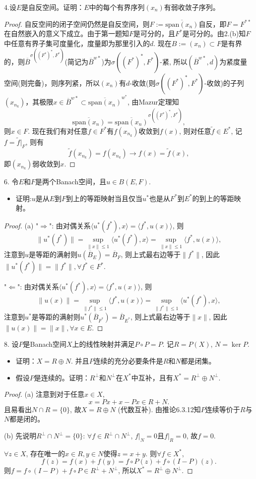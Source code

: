 \documentclass[a4paper,8pt]{ctexart}\textwidth 140mm \textheight 216mm
\newcommand{\8}{\infty}
\newcommand{\la}{\langle}
\newcommand{\ra}{\rangle}
\newcommand{\RA}{\Rightarrow}
\newcommand{\LA}{\Leftarrow}
\begin{document}
4.设$E$是自反空间。证明：$E$中的每个有界序列$(x_n)$有弱收敛子序列。
\begin{proof}
	自反空间的闭子空间仍然是自反空间，则$F:=\overline{\mathrm{span}(x_n)}$自反，即$F=F^{**}$在自然嵌入的意义下成立。由于第一题知$F$是可分的，且$F^*$是可分的。由2.(b)知$F$中任意有界子集可度量化，度量即为那里引入的$d$. 现在$B:=(x_n)\subset F$是有界的，则$\overline{B}^{\sigma((F^*)^*,F^*)}$(简记为$\overline{B}^{w*}$)为$\sigma((F^*)^*,F^*)$-紧, 所以$(\overline{B}^{w*},d)$为紧度量空间(则完备)，则序列紧，所以$(x_n)$有$d$-收敛(则$\sigma((F^*)^*,F^*)$-收敛)的子列$(x_{n_k})$，其极限$x\in \overline{B}^{w*}\subset \overline{\mathrm{span}(x_n)}^{w^*}$, 
	由Mazur定理知
	\[\overline{\mathrm{span}(x_n)}=\overline{\mathrm{span}(x_n)}^{\sigma((F^*)^*,F^*)},\] 
	则$x\in F$. 现在我们有对任意$f\in F^*$有$f(x_{n_k})$收敛到$f(x)$, 则对任意$\tilde{f}\in E^*$, 记$f=\tilde{f}|_{F}$, 则有
	\[\tilde{f}(x_{n_k})=f(x_{n_k})\to f(x)=\tilde{f}(x),\]
	即$(x_{n_k})$弱收敛到$x$.
\end{proof}

6. 令$E$和$F$是两个Banach空间，且$u\in B(E,F)$.
\begin{itemize}
	\item[(a)] 证明:$u$是从$E$到$F$到上的等距映射当且仅当$u^*$也是从$F^*$到$E^*$的到上的等距映射。
\end{itemize}
\begin{proof}
	(a) "$\RA$": 由对偶关系$\la u^*(f^*), x\ra=\la f^*, u(x)\ra$, 则
	\[\|u^*(f^*)\|=\sup_{\|x\|\leq 1}\la u^*(f^*), x\ra=\sup_{\|x\|\leq 1}\la f^*, u(x)\ra,\]
	注意到$u$是等距的满射则$u(\overline{B}_{E})=\overline{B}_F$, 则上式最右边等于$\|f^*\|$, 因此$\|u^*(f^*)\|=\|f^*\|,\forall f^*\in F^*$.
	
	"$\LA$": 由对偶关系$\la u^*(f^*), x\ra=\la f^*, u(x)\ra$, 则
	\[\|u(x)\|=\sup_{\|f^*\|\leq 1}\la f^*, u(x)\ra=\sup_{\|f^*\|\leq 1}\la u^*(f^*), x\ra,\]
	注意到$u^*$是等距的满射则$u^*(\overline{B}_{F^*})=\overline{B}_{E^*}$, 则上式最右边等于$\|x\|$, 因此$\|u(x)\|=\|x\|,\forall x\in E$.
\end{proof}

8. 设$P$是Banach空间$X$上的线性映射并满足$P\circ P=P$. 记$R=P(X)$, $N=\ker P$.
\begin{itemize}
	\item[(a)] 证明：$X=R\oplus N$. 并且$P$连续的充分必要条件是$R$和$N$都是闭集。 
	\item[(b)] 假设$P$是连续的。证明：$R^{\perp}$和$N^{\perp}$在$X^*$中互补，且有$X^*=R^{\perp}\oplus N^{\perp}$. 
\end{itemize}
\begin{proof}
	(a) 注意到对于任意$x\in X$, 
	\[x=Px+x-Px\in R+N.\]
	且易看出$N\cap R=\{0\}$, 故$X=R\oplus N$ (代数互补). 由推论6.3.12知$P$连续等价于$R$与$N$都是闭的。
	
	(b) 先说明$R^{\perp}\cap N^{\perp}=\{0\}$: $\forall f\in R^{\perp}\cap N^{\perp}$, $f|_N=0$且$f|_R=0$, 故$f=0$. 
	
	$\forall z\in X$, 存在唯一的$x\in R,y\in N$使得$z=x+y$. 则$\forall f\in X^*$, 
	\[f(z)=f(x)+f(y)=f\circ P(z)+f\circ (I-P)(z).\]
	则$f=f\circ (I-P)+f\circ P\in R^{\perp}+N^{\perp}$, 所以$X^*=R^{\perp}\oplus N^{\perp}$.
\end{proof}
\end{document}
